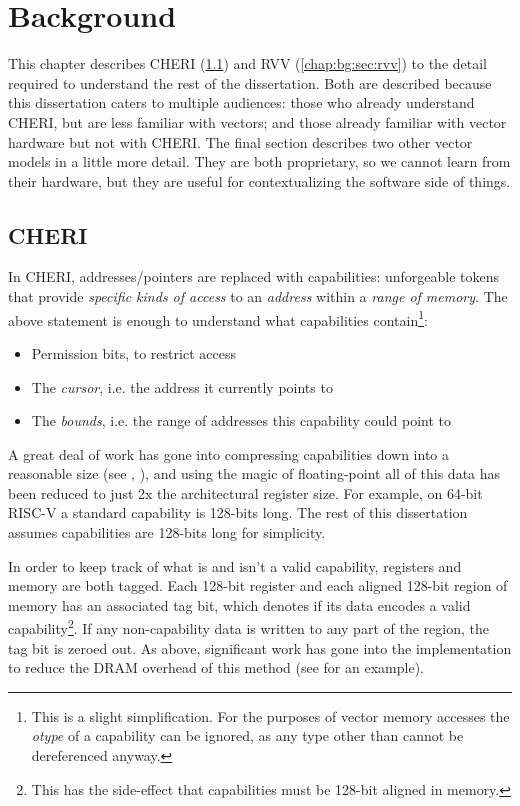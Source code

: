 \chapter{Background}

This chapter describes CHERI (\cref{chap:bg:sec:cheri}) and RVV (\cref{chap:bg:sec:rvv}) to the detail required to understand the rest of the dissertation.
Both are described because this dissertation caters to multiple audiences: those who already understand CHERI, but are less familiar with vectors; and those already familiar with vector hardware but not with CHERI.
The final section describes two other vector models in a little more detail.
They are both proprietary, so we cannot learn from their hardware, but they are useful for contextualizing the software side of things.


\section{CHERI}\label{chap:bg:sec:cheri}
In CHERI, addresses/pointers are replaced with capabilities: unforgeable tokens that provide \emph{specific kinds of access} to an \emph{address} within a \emph{range of memory}.
The above statement is enough to understand what capabilities contain\footnote{This is a slight simplification. For the purposes of vector memory accesses the \emph{otype} of a capability can be ignored, as any type other than  cannot be dereferenced anyway.}:
\begin{itemize}
    \item Permission bits, to restrict access
    \item The \emph{cursor}, i.e. the address it currently points to
    \item The \emph{bounds}, i.e. the range of addresses this capability could point to
\end{itemize}
A great deal of work has gone into compressing capabilities down into a reasonable size (see , ), and using the magic of floating-point all of this data has been reduced to just 2x the architectural register size.
For example, on 64-bit RISC-V a standard capability is 128-bits long.
The rest of this dissertation assumes capabilities are 128-bits long for simplicity.

In order to keep track of what is and isn't a valid capability, registers and memory are both tagged.
Each 128-bit register and each aligned 128-bit region of memory has an associated tag bit, which denotes if its data encodes a valid capability\footnote{This has the side-effect that capabilities must be 128-bit aligned in memory.}.
If any non-capability data is written to any part of the region, the tag bit is zeroed out.
As above, significant work has gone into the implementation to reduce the DRAM overhead of this method (see  for an example).


